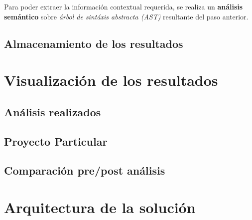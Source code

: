 Para poder extraer la información contextual requerida, se realiza un \textbf{análisis semántico} sobre \textit{árbol de sintáxis abstracta (AST)} resultante del paso anterior.

\subsection{Almacenamiento de los resultados}

\section{Visualización de los resultados}
\subsection{Análisis realizados}
\subsection{Proyecto Particular}
\subsection{Comparación pre/post análisis}

\section{Arquitectura de la solución}
